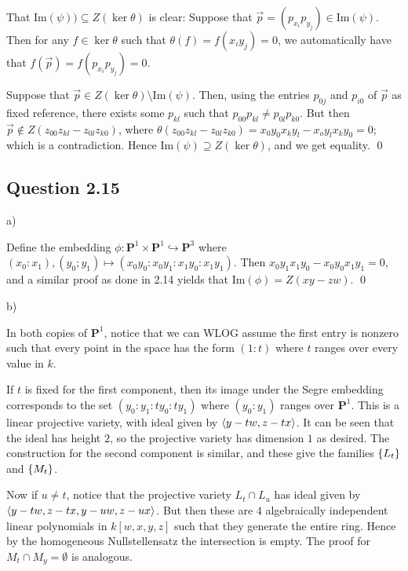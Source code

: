 \documentclass{article}
\begin{document}
That $\text{Im}(\psi)) \subseteq Z(\ker \theta)$ is clear: Suppose that $\vec p = (p_{x_i}p_{y_j}) \in \text{Im}(\psi)$. Then for any $f \in \ker \theta$ such that $\theta(f) = f(x_iy_j) = 0$, we automatically have that $f(\vec p) = f(p_{x_i}p_{y_j}) = 0$.

Suppose that $\vec p \in Z(\ker \theta) \setminus \text{Im}(\psi)$. Then, using the entries $p_{0j}$ and $p_{i0}$ of $\vec p$ as fixed reference, there exists some $p_{kl}$ such that $p_{00}p_{kl} \neq p_{0l}p_{k0}$. But then $\vec p \not \in Z(z_{00}z_{kl} - z_{0l}z_{k0})$, where $\theta(z_{00}z_{kl} - z_{0l}z_{k0}) = x_0y_0 x_ky_l - x_oy_lx_ky_0 = 0$; which is a contradiction. Hence $\text{Im}(\psi) \supseteq Z(\ker \theta)$, and we get equality. \qed
\lspace

\subsection*{Question 2.15}

\noindent a)

Define the embedding $\phi: \mathbf{P}^1 \times \mathbf{P}^1 \hookrightarrow \mathbf{P}^3$ where $(x_0:x_1),(y_0;y_1) \mapsto (x_0y_0:x_0y_1:x_1y_0:x_1y_1)$. Then $x_0y_1x_1y_0 - x_0y_0x_1y_1 = 0$, and a similar proof as done in 2.14 yields that $\text{Im}(\phi) = Z(xy-zw)$. \qed

\noindent b)

In both copies of $\mathbf{P}^1$, notice that we can WLOG assume the first entry is nonzero such that every point in the space has the form $(1:t)$ where $t$ ranges over every value in $k$.

If $t$ is fixed for the first component, then its image under the Segre embedding corresponds to the set $(y_0:y_1:ty_0:ty_1)$ where $(y_0:y_1)$ ranges over $\mathbf{P}^1$. This is a linear projective variety, with ideal given by $\langle y-tw,z-tx\rangle$. It can be seen that the ideal has height $2$, so the projective variety has dimension $1$ as desired. The construction for the second component is similar, and these give the families $\{L_t\}$ and $\{M_t\}$.

Now if $u \neq t$, notice that the projective variety $L_t \cap L_u$ has ideal given by $\langle y-tw, z-tx,y-uw, z-ux\rangle$. But then these are $4$ algebraically independent linear polynomials in $k[w,x,y,z]$ such that they generate the entire ring. Hence by the homogeneous Nullstellensatz the intersection is empty. The proof for $M_t \cap M_y = \emptyset$ is analogous.
\end{document}
